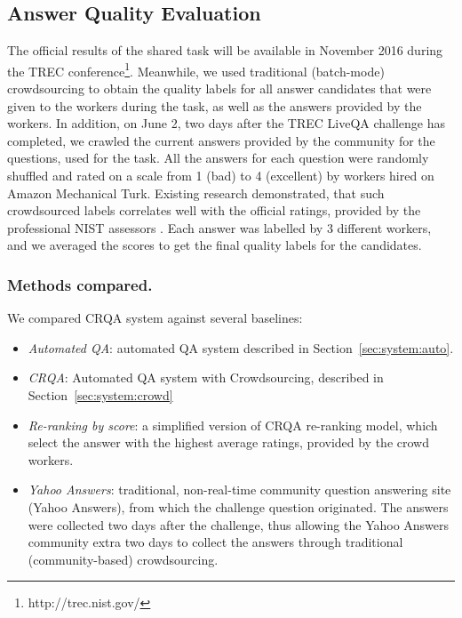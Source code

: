 \subsection{Answer Quality Evaluation}
The official results of the shared task will be available in November 2016 during the TREC conference\footnote{http://trec.nist.gov/}.
Meanwhile, we used traditional (batch-mode) crowdsourcing to obtain the quality labels for all answer candidates that were given to the workers during the task, as well as the answers provided by the workers.
In addition, on June 2, two days after the TREC LiveQA challenge has completed, we crawled the current answers provided by the community for the questions, used for the task.
All the answers for each question were randomly shuffled and rated on a scale from 1 (bad) to 4 (excellent) by workers hired on Amazon Mechanical Turk.
Existing research demonstrated, that such crowdsourced labels correlates well with the official ratings, provided by the professional NIST assessors \cite{savenkov_crowdsourcing2016a}.
Each answer was labelled by 3 different workers, and we averaged the scores to get the final quality labels for the candidates.

\subsubsection{Methods compared.}
We compared CRQA system against several baselines:
\begin{itemize}
\item \textit{Automated QA}: automated QA system described in Section~\ref{sec:system:auto}.
\item \textit{CRQA}: Automated QA system with Crowdsourcing, described in Section~\ref{sec:system:crowd}
\item \textit{Re-ranking by score}: a simplified version of CRQA re-ranking model, which select the answer with the highest average ratings, provided by the crowd workers.
\item \textit{Yahoo Answers}: traditional, non-real-time community question answering site (Yahoo Answers), from which the challenge question originated. The answers were collected two days after the challenge, thus allowing the Yahoo Answers community extra two days to collect the answers through traditional (community-based) crowdsourcing.
\end{itemize}

